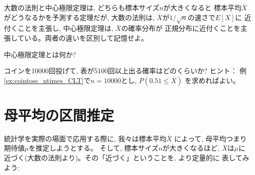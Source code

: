 大数の法則と中心極限定理は, どちらも標本サイズ$n$が大きくなると
標本平均$\overline{X}$がどうなるかを予測する定理だが, 
大数の法則は, $\overline{X}$が$1/\sqrt{n}$の速さで$E[X]$に
近付くことを主張し, 中心極限定理は, $\overline{X}$の確率分布が
正規分布に近付くことを主張している。両者の違いを区別して記憶せよ。\\

\begin{q}\label{q:stat_CLTdef} 中心極限定理とは何か?\end{q}
\mv

\begin{q}\label{q:stat_CLT_coin10000}
コインを10000回投げて, 表が5100回以上出る確率はどのくらいか?
ヒント： 例\ref{ex:cointoss_ntimes_CLT}で$n=10000$とし, $P(0.51\leq \overline{X})$
を求めればよい。\end{q}
\vv


\section{母平均の区間推定}

統計学を実際の場面で応用する際に, 我々は標本平均$\overline{X}$
によって, 母平均つまり期待値$\mu$を推定しようとする。
そして, 標本サイズ$n$が大きくなるほど, $\overline{X}$は$\mu$に
近づく(大数の法則より)。その「近づく」ということを, より定量的に
表してみよう:

